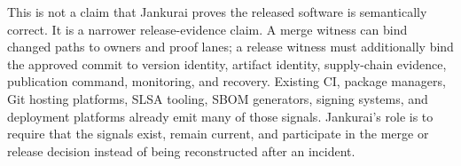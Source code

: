 This is not a claim that Jankurai proves the released software is semantically correct. It is a narrower release-evidence claim. A merge witness can bind changed paths to owners and proof lanes; a release witness must additionally bind the approved commit to version identity, artifact identity, supply-chain evidence, publication command, monitoring, and recovery. Existing CI, package managers, Git hosting platforms, SLSA tooling, SBOM generators, signing systems, and deployment platforms already emit many of those signals. Jankurai's role is to require that the signals exist, remain current, and participate in the merge or release decision instead of being reconstructed after an incident.
